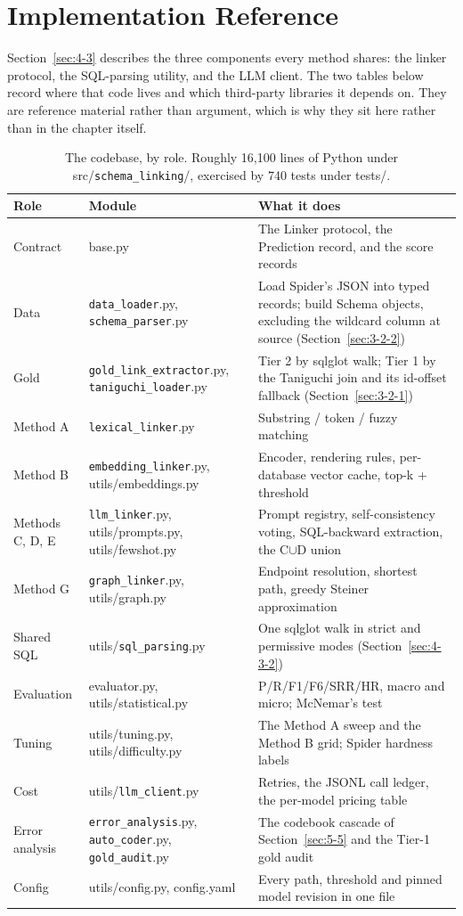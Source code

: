 \chapter{Implementation Reference}\label{app:D}

Section~\ref{sec:4-3} describes the three components every method shares: the linker protocol, the SQL-parsing utility, and the LLM client. The two tables below record where that code lives and which third-party libraries it depends on. They are reference material rather than argument, which is why they sit here rather than in the chapter itself.

\begin{table}[htbp]
\centering
\caption{The codebase, by role. Roughly 16,100 lines of Python under src/\texttt{schema\_linking}/, exercised by 740 tests under tests/.}\label{tab:D-1}
\setlength{\tabcolsep}{6pt}
\begin{tabular}{@{}>{\raggedright\arraybackslash}p{}>{\raggedright\arraybackslash}p{}>{\raggedright\arraybackslash}p{}@{}}
\toprule
\textbf{Role} & \textbf{Module} & \textbf{What it does}\tabularnewline
\midrule
Contract & base.py & The Linker protocol, the Prediction record, and the score records\tabularnewline
Data & \texttt{data\_loader}.py, \texttt{schema\_parser}.py & Load Spider's JSON into typed records; build Schema objects, excluding the wildcard column at source (Section~\ref{sec:3-2-2})\tabularnewline
Gold & \texttt{gold\_link\_extractor}.py, \texttt{taniguchi\_loader}.py & Tier 2 by sqlglot walk; Tier 1 by the Taniguchi join and its id-offset fallback (Section~\ref{sec:3-2-1})\tabularnewline
Method A & \texttt{lexical\_linker}.py & Substring / token / fuzzy matching\tabularnewline
Method B & \texttt{embedding\_linker}.py, utils/embeddings.py & Encoder, rendering rules, per-database vector cache, top-k + threshold\tabularnewline
Methods C, D, E & \texttt{llm\_linker}.py, utils/prompts.py, utils/fewshot.py & Prompt registry, self-consistency voting, SQL-backward extraction, the C\ensuremath{\cup}D union\tabularnewline
Method G & \texttt{graph\_linker}.py, utils/graph.py & Endpoint resolution, shortest path, greedy Steiner approximation\tabularnewline
Shared SQL & utils/\texttt{sql\_parsing}.py & One sqlglot walk in strict and permissive modes (Section~\ref{sec:4-3-2})\tabularnewline
Evaluation & evaluator.py, utils/statistical.py & P/R/F1/F6/SRR/HR, macro and micro; McNemar's test\tabularnewline
Tuning & utils/tuning.py, utils/difficulty.py & The Method A sweep and the Method B grid; Spider hardness labels\tabularnewline
Cost & utils/\texttt{llm\_client}.py & Retries, the JSONL call ledger, the per-model pricing table\tabularnewline
Error analysis & \texttt{error\_analysis}.py, \texttt{auto\_coder}.py, \texttt{gold\_audit}.py & The codebook cascade of Section~\ref{sec:5-5} and the Tier-1 gold audit\tabularnewline
Config & utils/config.py, config.yaml & Every path, threshold and pinned model revision in one file\tabularnewline
\bottomrule
\end{tabular}
\end{table}




